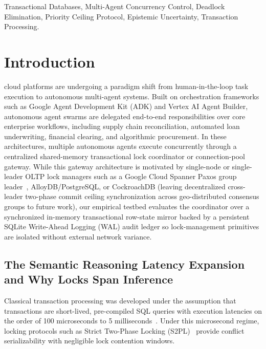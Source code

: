 \documentclass[conference,10pt]{IEEEtran}
\begin{document}
\begin{IEEEkeywords}
Transactional Databases, Multi-Agent Concurrency Control, Deadlock Elimination, Priority Ceiling Protocol, Epistemic Uncertainty, Transaction Processing.
\end{IEEEkeywords}

\section{Introduction}
 cloud platforms are undergoing a paradigm shift from human-in-the-loop task execution to autonomous multi-agent systems. Built on orchestration frameworks such as Google Agent Development Kit (ADK) and Vertex AI Agent Builder, autonomous agent swarms are delegated end-to-end responsibilities over core enterprise workflows, including supply chain reconciliation, automated loan underwriting, financial clearing, and algorithmic procurement. In these architectures, multiple autonomous agents execute concurrently through a centralized shared-memory transactional lock coordinator or connection-pool gateway. While this gateway architecture is motivated by single-node or single-leader OLTP lock managers such as a Google Cloud Spanner Paxos group leader~\cite{corbett2013spanner}, AlloyDB/PostgreSQL, or CockroachDB (leaving decentralized cross-leader two-phase commit ceiling synchronization across geo-distributed consensus groups to future work), our empirical testbed evaluates the coordinator over a synchronized in-memory transactional row-state mirror backed by a persistent SQLite Write-Ahead Logging (WAL) audit ledger so lock-management primitives are isolated without external network variance.

\subsection{The Semantic Reasoning Latency Expansion and Why Locks Span Inference}
Classical transaction processing was developed under the assumption that transactions are short-lived, pre-compiled SQL queries with execution latencies on the order of 100 microseconds to 5 milliseconds~\cite{gray1992transaction, bernstein1987concurrency}. Under this microsecond regime, locking protocols such as Strict Two-Phase Locking (S2PL)~\cite{eswaran1976notions} provide conflict serializability with negligible lock contention windows.
\end{document}
